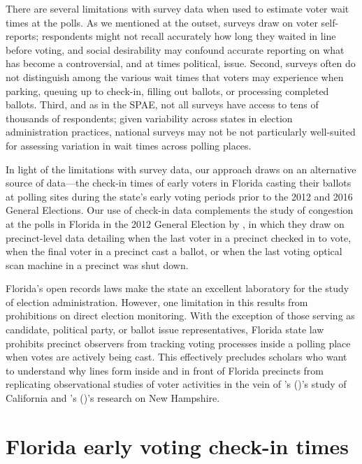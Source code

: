 \documentclass[12pt,titlepage]{article}
\newcommand{\possessivecite}[1]{\citeauthor{#1}'s (\citeyear{#1})}
\begin{document}
There are several limitations with survey data when used to estimate
voter wait times at the polls. As we mentioned at the outset, surveys
draw on voter self-reports; respondents might not recall accurately
how long they waited in line before voting, and social desirability
may confound accurate reporting on what has become a controversial,
and at times political, issue.  Second, surveys often do not
distinguish among the various wait times that voters may experience
when parking, queuing up to check-in, filling out ballots, or
processing completed ballots. Third, and as in the SPAE, not all
surveys have access to tens of thousands of respondents; given
variability across states in election administration practices,
national surveys may not be not particularly well-suited for assessing
variation in wait times across polling places.

In light of the limitations with survey data, our approach draws on an
alternative source of data---the check-in times of early voters in
Florida casting their ballots at polling sites during the state's
early voting periods prior to the 2012 and 2016 General Elections.
Our use of check-in data complements the study of congestion at the
polls in Florida in the 2012 General Election by
\cite{herronsmith:closingtimes}, in which they draw on precinct-level
data detailing when the last voter in a precinct checked in to vote,
when the final voter in a precinct cast a ballot, or when the last
voting optical scan machine in a precinct was shut down.

Florida's open records laws make the state an excellent laboratory for
the study of election administration.  However, one limitation in this
results from prohibitions on direct election monitoring.  With the
exception of those serving as candidate, political party, or ballot
issue representatives, Florida state law prohibits precinct observers
from tracking voting processes inside a polling place when votes are
actively being cast. This effectively precludes scholars who want to
understand why lines form inside and in front of Florida precincts
from replicating observational studies of voter activities in the vein
of \possessivecite{spencermarkovits:renege}'s study of California and
\possessivecite{herronsmith:hanoverstudy}'s research on New Hampshire.

\section*{Florida early voting check-in times}
\end{document}
